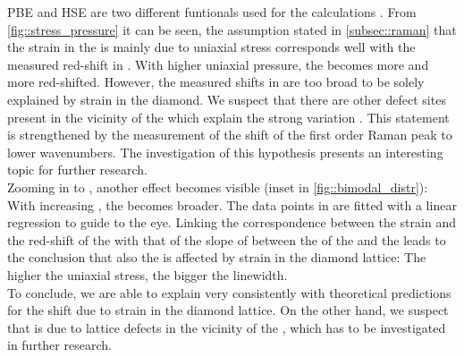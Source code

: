 	PBE and HSE are two different funtionals used for the calculations .
	From \autoref{fig::stress_pressure} it can be seen, the assumption stated in \autoref{subsec::raman} that the strain in the \nds is mainly due to uniaxial stress corresponds well with the measured \ZPL red-shift in \gv.
	With higher uniaxial pressure, the \ZPL becomes more and more red-shifted.
	However, the measured shifts in \gh are too broad to be solely explained by strain in the diamond.
	We suspect that there are other defect sites present in the vicinity of the \siv which explain the strong variation \cite{Thiering2015}.
	This statement is strengthened by the measurement of the shift of the first order Raman peak to lower wavenumbers.
	The investigation of this hypothesis presents an interesting topic for further research.
	\\
	Zooming in to \gv, another effect becomes visible (inset in \autoref{fig::bimodal_distr}):
	With increasing  \ZPL, the \lw becomes broader.
	The data points in \gv are fitted with a linear regression to guide to the eye.
	Linking the correspondence between the strain and the red-shift of the \ZPL with that of the slope of between the \cwl of the \ZPL and the \lw leads to the conclusion that also the \lw is affected by strain in the diamond lattice: The higher the uniaxial stress, the bigger the linewidth.
	\\
	To conclude, we are able to explain \gv very consistently with theoretical predictions for the \ZPL \cwl shift due to strain in the diamond lattice. 
	On the other hand, we suspect that \gh is due to lattice defects in the vicinity of the \siv, which has to be investigated in further research.
